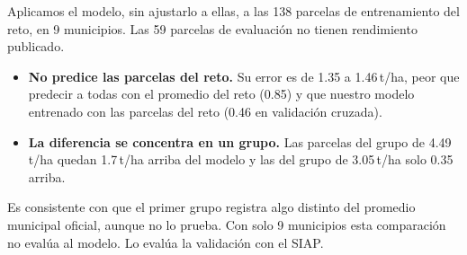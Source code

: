 Aplicamos el modelo, sin ajustarlo a ellas, a las 138 parcelas de entrenamiento del reto, en 9 municipios. Las 59
parcelas de evaluación no tienen rendimiento publicado.
\begin{itemize}
\item \textbf{No predice las parcelas del reto.} Su error es de 1.35 a 1.46\,t/ha, peor que predecir a todas con el
promedio del reto (0.85) y que nuestro modelo entrenado con las parcelas del reto (0.46 en validación cruzada).
\item \textbf{La diferencia se concentra en un grupo.} Las parcelas del grupo de 4.49\,t/ha quedan 1.7\,t/ha arriba del
modelo y las del grupo de 3.05\,t/ha solo 0.35 arriba.
\end{itemize}
Es consistente con que el primer grupo registra algo distinto del promedio municipal oficial, aunque no lo prueba. Con
solo 9 municipios esta comparación no evalúa al modelo. Lo evalúa la validación con el SIAP.

